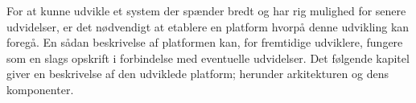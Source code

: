 For at kunne udvikle et system der spænder bredt og har rig mulighed for senere udvidelser, er det nødvendigt at etablere en platform hvorpå denne udvikling kan foregå.
En sådan beskrivelse af platformen kan, for fremtidige udviklere, fungere som en slags opskrift i forbindelse med eventuelle udvidelser.
Det følgende kapitel giver en beskrivelse af den udviklede platform; herunder arkitekturen og dens komponenter.